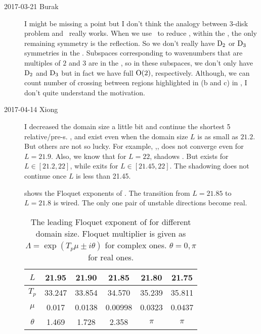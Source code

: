 \begin{description}
\item[2017-03-21 Burak]
I might be missing a point but I don't think the analogy between 3-disk
problem and \KS\ really works. When we use \fFslice\ to reduce  ,
within the \slice , the only remaining symmetry is the reflection.
So we don't really have $\textrm{D}_{2}$ or $\textrm{D}_{3}$ symmetries in the \fFslice .
Subspaces corresponding to wavenumbers that are multiples of $2$ and $3$
are in the \sliceBord , so in these subspaces,
we don't only have $\textrm{D}_{2}$ and $\textrm{D}_{3}$ but in fact we have full
$\textrm{O}(2)$, respectively. Although, we can count number of crossing between
regions highlighted in (b and c) in \fFslice , I don't
quite understand the motivation.


\item[2017-04-14 Xiong]
I decreased the domain size a little bit and continue the shortest 5
relative/pre-\po s. ,  and  exist even when
the domain size $L$ is as small as $21.2$. But others are not so lucky.
For example, ,, does not converge even for 
$L = 21.9$. Also, we know that for $L=22$,  shadows .
But  exists for $L\in[21.2, 22]$,
while  exits for $L\in[21.45, 22]$. The shadowing 
does not continue once $L$ is less than 21.45.

 shows the Floquet exponents of .
The transition from $L=21.85$ to $L=21.8$ is wired. The only one 
pair of unstable directions become real.
\begin{table}[h]
  \centering
  \begin{tabular}{c|ccccc}
    $L$       &  21.95  &  21.90   & 21.85   & 21.80  & 21.75  \\
    \hline
    $T_p$     & 33.247  &  33.854  & 34.570  & 35.239 & 35.811 \\
    $\mu$     &  0.017  &  0.0138  & 0.00998 & 0.0323 & 0.0437 \\
    $\theta$  &  1.469  &  1.728   & 2.358   &  $\pi$ &  $\pi$
  \end{tabular}
  \caption{
    The leading Floquet exponent of  for different domain size.
    Floquet multiplier is given 
    as $\Lambda = \exp(T_p\mu \pm i\theta)$ for complex ones.
    $\theta = 0, \pi$ for real ones.
  }
  \label{tab:ks_stab_rpo2}
\end{table}


\end{description}
